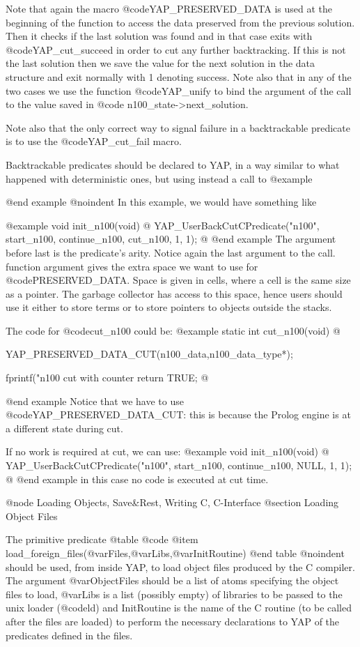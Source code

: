 Note that again the macro @code{YAP_PRESERVED_DATA} is used at the
beginning of the function to access the data preserved from the previous
solution.  Then it checks if the last solution was found and in that
case exits with @code{YAP_cut_succeed} in order to cut any further
backtracking.  If this is not the last solution then we save the value
for the next solution in the data structure and exit normally with 1
denoting success. Note also that in any of the two cases we use the
function @code{YAP_unify} to bind the argument of the call to the value
saved in @code{ n100_state->next_solution}.


Note also that the only correct way to signal failure in a backtrackable
predicate is to use the @code{YAP_cut_fail} macro.

Backtrackable predicates should be declared to YAP, in a way
similar to what happened with deterministic ones, but using instead a
call to
@example
     
@end example
@noindent
 In this example, we would have something like

@example
void
init_n100(void)
@{
  YAP_UserBackCutCPredicate("n100", start_n100, continue_n100, cut_n100, 1, 1);
@}
@end example
The argument before last is the predicate's arity. Notice again the
last argument to the call. function argument gives the extra space we
want to use for @code{PRESERVED_DATA}. Space is given in cells, where
a cell is the same size as a pointer. The garbage collector has access
to this space, hence users should use it either to store terms or to
store pointers to objects outside the stacks.

The code for @code{cut_n100} could be:
@example
static int cut_n100(void)
@{
  YAP_PRESERVED_DATA_CUT(n100_data,n100_data_type*);

  fprintf("n100 cut with counter %
  return TRUE;
@}
@end example
Notice that we have to use @code{YAP_PRESERVED_DATA_CUT}: this is
because the Prolog engine is at a different state during cut.

If no work is required at cut, we can use:
@example
void
init_n100(void)
@{
  YAP_UserBackCutCPredicate("n100", start_n100, continue_n100, NULL, 1, 1);
@}
@end example
in this case no code is executed at cut time.

@node Loading Objects, Save&Rest, Writing C, C-Interface
@section Loading Object Files

The primitive predicate
@table @code
@item     load_foreign_files(@var{Files},@var{Libs},@var{InitRoutine})
@end table
@noindent
should be used, from inside YAP, to load object files produced by the C
compiler. The argument @var{ObjectFiles} should be a list of atoms
specifying the object files to load, @var{Libs} is a list (possibly
empty) of libraries to be passed to the unix loader (@code{ld}) and
InitRoutine is the name of the C routine (to be called after the files
are loaded) to perform the necessary declarations to YAP of the
predicates defined in the files. 

